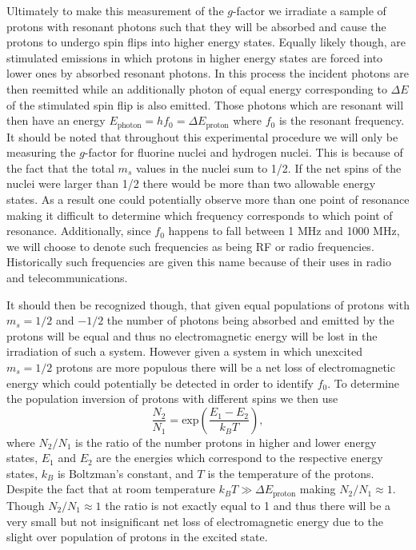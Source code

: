 \documentclass[prb,preprint]{revtex4-1}
\begin{document}
Ultimately to make this measurement of the $g$-factor we irradiate a sample of protons with resonant photons such that they will be absorbed and cause the protons to undergo spin flips into higher energy states. Equally likely though, are stimulated emissions in which protons in higher energy states are forced into lower ones by absorbed resonant photons. In this process the incident photons are then reemitted while an additionally photon of equal energy corresponding to $\Delta E$ of the stimulated spin flip is also emitted. Those photons which are resonant will then have an energy $E_{\text{photon}}=hf_0=\Delta E_{\text{proton}}$ where $f_0$ is the resonant frequency. It should be noted that throughout this experimental procedure we will only be measuring the $g$-factor for fluorine nuclei and hydrogen nuclei. This is because of the fact that the total $m_s$ values in the nuclei sum to 1/2. If the net spins of the nuclei were larger than 1/2 there would be more than two allowable energy states. As a result one could potentially observe more than one point of resonance making it difficult to determine which frequency corresponds to which point of resonance. Additionally, since $f_0$ happens to fall between 1 MHz and 1000 MHz, we will choose to denote such frequencies as being RF or radio frequencies. Historically such frequencies are given this name because of their uses in radio and telecommunications.

It should then be recognized though, that given equal populations of protons with $m_s=1/2$ and $-1/2$ the number of photons being absorbed and emitted by the protons will be equal and thus no electromagnetic energy will be lost in the irradiation of such a system. However given a system in which unexcited $m_s=1/2$ protons are more populous there will be a net loss of electromagnetic energy which could potentially be detected in order to identify $f_0$. To determine the population inversion of protons with different spins we then use 
\begin{equation}\label{popinv}
\frac{N_2}{N_1}=\text{exp}\left(\frac{E_1-E_2}{k_BT}\right),
\end{equation}
where $N_2/N_1$ is the ratio of the number protons in higher and lower energy states, $E_1$ and $E_2$ are the energies which correspond to the respective energy states, $k_B$ is Boltzman's constant, and $T$ is the temperature of the protons. Despite the fact that at room temperature $k_BT\gg\Delta E_{\text{proton}}$ making $N_2/N_1\approx1$. Though $N_2/N_1\approx1$ the ratio is not exactly equal to 1 and thus there will be a very small but not insignificant net loss of electromagnetic energy due to the slight over population of protons in the excited state. 
\end{document}
